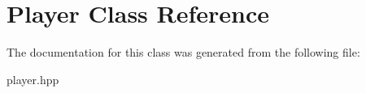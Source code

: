 \hypertarget{classPlayer}{}\section{Player Class Reference}
\label{classPlayer}


The documentation for this class was generated from the following file\+:\begin{DoxyCompactItemize}
\item 
player.\+hpp\end{DoxyCompactItemize}
